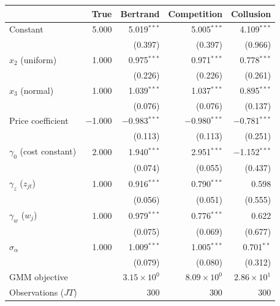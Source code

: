 \begin{tabular}{lrrrr}
\toprule
 & True & Bertrand & Competition & Collusion \\
\midrule
Constant & 5.000 & 5.019$^{***}$ & 5.005$^{***}$ & 4.109$^{***}$ \\
 &  & (0.397) & (0.397) & (0.966) \\
$x_2$ (uniform) & 1.000 & 0.975$^{***}$ & 0.971$^{***}$ & 0.778$^{***}$ \\
 &  & (0.226) & (0.226) & (0.261) \\
$x_3$ (normal) & 1.000 & 1.039$^{***}$ & 1.037$^{***}$ & 0.895$^{***}$ \\
 &  & (0.076) & (0.076) & (0.137) \\
Price coefficient & $-$1.000 & $-$0.983$^{***}$ & $-$0.980$^{***}$ & $-$0.781$^{***}$ \\
 &  & (0.113) & (0.113) & (0.251) \\
$\gamma_0$ (cost constant) & 2.000 & 1.940$^{***}$ & 2.951$^{***}$ & $-$1.152$^{***}$ \\
 &  & (0.074) & (0.055) & (0.437) \\
$\gamma_z$ ($z_{jt}$) & 1.000 & 0.916$^{***}$ & 0.790$^{***}$ & 0.598 \\
 &  & (0.056) & (0.051) & (0.555) \\
$\gamma_w$ ($w_j$) & 1.000 & 0.979$^{***}$ & 0.776$^{***}$ & 0.622 \\
 &  & (0.075) & (0.069) & (0.677) \\
$\sigma_\alpha$ & 1.000 & 1.009$^{***}$ & 1.005$^{***}$ & 0.701$^{**}$ \\
 &  & (0.079) & (0.080) & (0.312) \\
\midrule
GMM objective &  & $3.15\times10^{0}$ & $8.09\times10^{0}$ & $2.86\times10^{1}$ \\
Observations ($JT$) &  & 300 & 300 & 300 \\
\bottomrule
\end{tabular}
